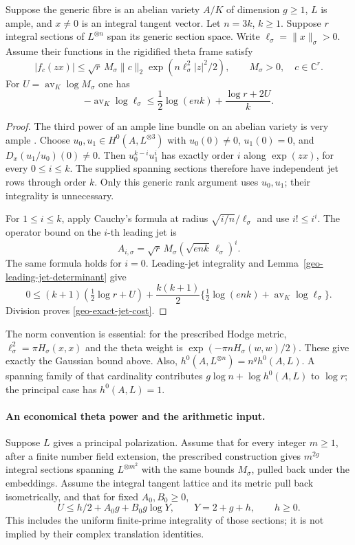 \begin{proposition}\label{geo-theta-jet-bound}
Suppose the generic fibre is an abelian variety $A/K$ of dimension
$g\ge1$, $L$ is ample, and $x\ne0$ is an integral tangent vector.
Let $n=3k$, $k\ge1$. Suppose $r$ integral sections of $L^{\otimes n}$
span its generic section space. Write $\ell_\sigma=\|x\|_\sigma>0$.
Assume their functions in the rigidified theta frame satisfy
\[
 |f_c(zx)|\le\sqrt r\,M_\sigma\|c\|_2
                    \exp(n\ell_\sigma^2|z|^2/2),
 \qquad M_\sigma>0,\quad c\in\mathbb C^r .
\]
For $U=\operatorname{av}_K\log M_\sigma$ one has
\begin{equation}\label{geo-exact-jet-cost}
 -\operatorname{av}_K\log\ell_\sigma
       \le\frac12\log(enk)+\frac{\log r+2U}{k}.
\end{equation}
\end{proposition}
\begin{proof}
The third power of an ample line bundle on an abelian variety is
very ample \cite[Theorem~2.2.3]{genestier-ngo-shimura}.
Choose $u_0,u_1\in H^0(A,L^{\otimes3})$ with $u_0(0)\ne0$,
$u_1(0)=0$, and $D_x(u_1/u_0)(0)\ne0$. Then
$u_0^{k-i}u_1^i$ has exactly order $i$ along $\exp(zx)$,
for every $0\le i\le k$. The supplied spanning sections therefore
have independent jet rows through order $k$. Only this generic
rank argument uses $u_0,u_1$; their integrality is unnecessary.

For $1\le i\le k$, apply Cauchy's formula at radius
$\sqrt{i/n}/\ell_\sigma$ and use $i!\le i^i$. The operator bound
on the $i$-th leading jet is
\[
 A_{i,\sigma}=\sqrt r\,M_\sigma
                    (\sqrt{enk}\,\ell_\sigma)^i .
\]
The same formula holds for $i=0$. Leading-jet integrality and
Lemma~\ref{geo-leading-jet-determinant} give
\[
 0\le(k+1)(\tfrac12\log r+U)
       +\frac{k(k+1)}2
          \{\tfrac12\log(enk)+\operatorname{av}_K\log\ell_\sigma\}.
\]
Division proves \eqref{geo-exact-jet-cost}.
\end{proof}

The norm convention is essential: for the prescribed Hodge metric,
$\ell_\sigma^2=\pi H_\sigma(x,x)$ and the theta weight is
$\exp(-\pi nH_\sigma(w,w)/2)$. These give exactly the Gaussian
bound above. Also, $h^0(A,L^{\otimes n})=n^g h^0(A,L)$.
A spanning family of that cardinality contributes
$g\log n+\log h^0(A,L)$ to $\log r$; the principal case has
$h^0(A,L)=1$.

\paragraph{An economical theta power and the arithmetic input.}
Suppose $L$ gives a principal polarization. Assume that for every
integer $m\ge1$, after a finite number field extension, the prescribed
construction gives $m^{2g}$ integral sections spanning $L^{\otimes m^2}$
with the same bounds $M_\sigma$, pulled back under the embeddings.
Assume the integral tangent lattice and its metric pull back
isometrically, and that for fixed $A_0,B_0\ge0$,
\[
 U\le h/2+A_0g+B_0g\log Y,\qquad Y=2+g+h,\qquad h\ge0.
\]
This includes the uniform finite-prime integrality of those sections;
it is not implied by their complex translation identities.

